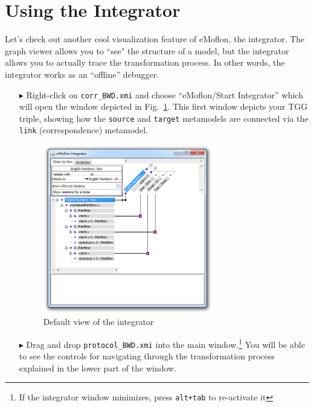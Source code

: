 \newpage
\hypertarget{sec:app_integrator}{}
\section{Using the Integrator}
\genHeader

Let's check out another cool visualization feature of eMoflon, the integrator. The graph viewer allows you to ``see" the structure of a model, but the
integrator allows you to actually trace the transformation process. In other words, the integrator works as an ``offline'' debugger.

\begin{itemize}

\item[$\blacktriangleright$] Right-click on \texttt{corr\_BWD.xmi} and choose ``eMoflon/Start Integrator'' which will open the window depicted in
Fig.~\ref{eclipse:integrator_start}. This first window depicts your TGG triple, showing how the \texttt{source} and \texttt{target} metamodels are connected
via the \texttt{link} (correspondence) metamodel.

\begin{figure}[htbp]
\begin{center}
  \includegraphics[width=0.7\textwidth]{eclipse_integratorStart}
  \caption{Default view of the integrator}
  \label{eclipse:integrator_start}
\end{center}
\end{figure}

\item[$\blacktriangleright$] Drag and drop \texttt{protocol\_BWD.xmi} into the main window.\footnote{If the integrator window minimizes, press \texttt{alt+tab}
to re-activate it} You will be able to see the controls for navigating through the transformation process explained in the lower part of the window.


\end{itemize}
